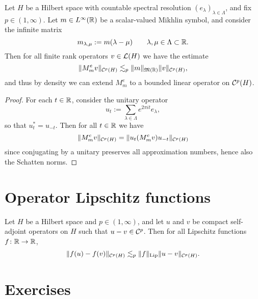 \begin{thm}
  Let $H$ be a Hilbert space with countable spectral resolution $(e_{\lambda})_{\lambda \in \Lambda}$, and fix $p \in (1,\infty)$.
  Let $m \in L^\infty(\mathbb{R})$ be a scalar-valued Mikhlin symbol, and consider the infinite matrix
  \begin{equation*}
    m_{\lambda,\mu} := m(\lambda - \mu) \qquad \lambda,\mu \in \Lambda \subset \mathbb{R}.
  \end{equation*}
  Then for all finite rank operators $v \in \mathcal{L}(H)$ we have the estimate
  \begin{equation*}
    \|M_{m}^{e} v\|_{\mathcal{C}^{p}(H)} \lesssim_{p} \|m\|_{\mathfrak{M}(\mathbb{R})} \|v\|_{\mathcal{C}^{p}(H)},
  \end{equation*}
  and thus by density we can extend $M_{m}^{e}$ to a bounded linear operator on $\mathcal{C}^{p}(H)$.
\end{thm}

\begin{proof}
  For each $t \in \mathbb{R}$, consider the unitary operator
  \begin{equation*}
    u_{t} := \sum_{\lambda \in \Lambda} e^{2\pi i t} e_{\lambda}, 
  \end{equation*}
  so that $u_{t}^{*} = u_{-t}$.
  Then for all $t \in \mathbb{R}$ we have
  \begin{equation*}
    \| M_{m}^{e} v \|_{\mathcal{C}^{p}(H)} = 
    \|u_{t}  (M_{m}^{e} v) u_{-t} \|_{\mathcal{C}^{p}(H)}
  \end{equation*}
  since conjugating by a unitary preserves all approximation numbers, hence also the Schatten norms.
\end{proof}




\section{Operator Lipschitz functions}

\begin{thm}
  Let $H$ be a Hilbert space and $p \in (1,\infty)$, and let $u$ and $v$ be compact self-adjoint operators on $H$ such that $u - v \in \mathcal{C}^{p}$.
  Then for all Lipschitz functions $f \colon \mathbb{R} \rightarrow \mathbb{R}$,
  \begin{equation*}
    \|f(u) - f(v)\|_{\mathcal{C}^{p}(H)} \lesssim_{p} \|f\|_{\mathrm{Lip}} \|u - v\|_{\mathcal{C}^{p}(H)}.
  \end{equation*}
\end{thm}

\section{Exercises}

